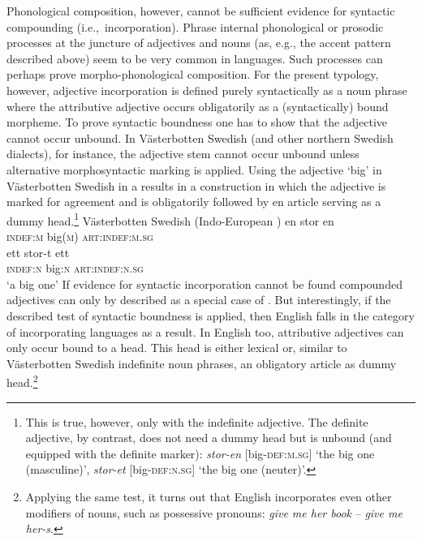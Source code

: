 Phonological composition, however, cannot be sufficient evidence for syntactic compounding (i.e.,~incorporation). Phrase internal phonological or prosodic processes at the juncture of adjectives and nouns (as, e.g., the accent pattern described above) seem to be very common in languages. Such processes can perhaps prove morpho-phonological composition. For the present typology, however, adjective incorporation is defined purely syntactically as a noun phrase where the attributive adjective occurs obligatorily as a (syntactically) bound morpheme. To prove syntactic boundness one has to show that the adjective cannot occur unbound. In Västerbotten Swedish (and other northern Swedish dialects), for instance, the adjective stem cannot occur unbound unless alternative morphosyntactic marking is applied. Using the adjective ‘big’ in Västerbotten Swedish in a  results in a construction in which the adjective is marked for agreement and is obligatorily followed by en article serving as a dummy head.\footnote{This is true, however, only with the indefinite adjective. The definite adjective, by contrast, does not need a dummy head but is unbound (and equipped with the definite marker): \textit{stor-en} [big-\textsc{def:m.sg}] ‘the big one (masculine)’, \textit{stor-et} [big-\textsc{def:n.sg}] ‘the big one (neuter)’.}
\ea 
\label{bondska headless}
\rm{Västerbotten Swedish (Indo-European \citealt{larsson1929})}
\ea
\gll 	en stor en\\	
	\textsc{indef:m} big(\textsc{m}) \textsc{art:indef:m.sg}\\
\ex
\gll 	ett stor-t ett\\	
	\textsc{indef:n} big:\textsc{n} \textsc{art:indef:n.sg}\\
\glt	‘a big one’
\z
\z
If evidence for syntactic incorporation cannot be found compounded adjectives can only by described as a special case of . But interestingly, if the described test of syntactic boundness is applied, then English falls in the category of incorporating languages as a result. In English too, attributive adjectives can only occur bound to a head. This head is either lexical or, similar to Västerbotten Swedish indefinite noun phrases, an obligatory article as dummy head.\footnote{Applying the same test, it turns out that English incorporates even other modifiers of nouns, such as possessive pronouns: \textit{give me her book} – \textit{give me her-s}.}

